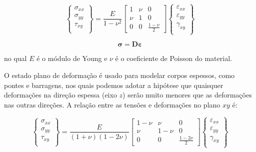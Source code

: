         \begin{equation}
            \begin{Bmatrix}
                \sigma_{xx}\\
                \sigma_{yy}\\
                \tau_{xy}\\
            \end{Bmatrix}
            =
            \frac{E}{1-\nu^2}
            \begin{bmatrix}
                1 & \nu & 0\\
                \nu & 1 & 0\\
                0 & 0 & \frac{1-\nu}{2}
            \end{bmatrix}
            \begin{Bmatrix}
                \varepsilon_{xx}\\
                \varepsilon_{yy}\\
                \gamma_{xy}\\
            \end{Bmatrix}
        \end{equation}

        \begin{equation}
            \bm{\sigma} =
            \mathbf{D}
            \bm{\varepsilon}
        \end{equation}


        \noindent no qual $E$ é o módulo de Young e $\nu$ é o coeficiente de Poisson do material.

        O estado plano de deformação é usado para modelar corpos espessos, como pontes e barragens, nos quais podemos adotar a hipótese que quaisquer deformações na direção espessa (eixo $z$) serão muito menores que as deformações nas outras direções. A relação entre as tensões e deformações no plano $xy$ é:

        \begin{equation*}
            \begin{Bmatrix}
                \sigma_{xx}\\
                \sigma_{yy}\\
                \tau_{xy}\\
            \end{Bmatrix}
            =
            \frac{E}{\left(1+\nu\right)\left(1-2\nu\right)}
            \begin{bmatrix}
                1-\nu & \nu & 0\\
                \nu & 1-\nu & 0\\
                0 & 0 & \frac{1-2\nu}{2}
            \end{bmatrix}
            \begin{Bmatrix}
                \varepsilon_{xx}\\
                \varepsilon_{yy}\\
                \gamma_{xy}\\
            \end{Bmatrix}
        \end{equation*}

